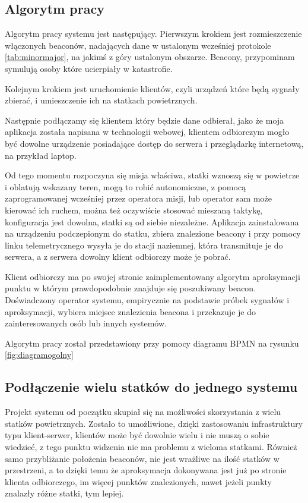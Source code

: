 \subsection{Algorytm pracy}

Algorytm pracy systemu jest następujący. Pierwszym krokiem jest rozmieszczenie włączonych beaconów, nadających dane w ustalonym wcześniej protokole \ref{tab:minormajor}, na jakimś z góry ustalonym obszarze. Beacony, przypominam symulują osoby które ucierpiały w katastrofie.

Kolejnym krokiem jest uruchomienie klientów, czyli urządzeń które będą sygnały zbierać, i umieszczenie ich na statkach powietrznych.

Następnie podłączamy się klientem który będzie dane odbierał, jako że moja aplikacja została napisana w technologii webowej, klientem odbiorczym mogło być dowolne urządzenie posiadające dostęp do serwera i przeglądarkę internetową, na przykład laptop.

Od tego momentu rozpoczyna się misja właściwa, statki wznoszą się w powietrze i oblatują wskazany teren, mogą to robić autonomiczne, z pomocą zaprogramowanej wcześniej przez operatora misji, lub operator sam może kierować ich ruchem, można też oczywiście stosować mieszaną taktykę, konfiguracja jest dowolna, statki są od siebie niezależne. Aplikacja zainstalowana na urządzeniu podczepionym do statku, zbiera znalezione beacony i przy pomocy linku telemetrycznego wysyła je do stacji naziemnej, która transmituje je do serwera, a z serwera dowolny klient odbiorczy może je pobrać.

Klient odbiorczy ma po swojej stronie zaimplementowany algorytm aproksymacji punktu w którym prawdopodobnie znajduje się poszukiwany beacon. Doświadczony operator systemu, empirycznie na podstawie próbek sygnałów i aproksymacji, wybiera miejsce znalezienia beacona i przekazuje je do zainteresowanych osób lub innych systemów.

Algorytm pracy został przedstawiony przy pomocy diagramu BPMN na rysunku \ref{fig:diagramogolny}

\subsection{Podłączenie wielu statków do jednego systemu}

Projekt systemu od początku skupiał się na możliwości skorzystania z wielu statków powietrznych. Zostało to umożliwione, dzięki zastosowaniu infrastruktury typu klient-serwer, klientów może być dowolnie wielu i nie muszą o sobie wiedzieć, z tego punktu widzenia nie ma problemu z wieloma statkami. Również samo przybliżanie położenia beaconów, nie jest wrażliwe na ilość statków w przestrzeni, a to dzięki temu że aproksymacja dokonywana jest już po stronie klienta odbiorczego, im więcej punktów znalezionych, nawet jeżeli punkty znalazły różne statki, tym lepiej.

